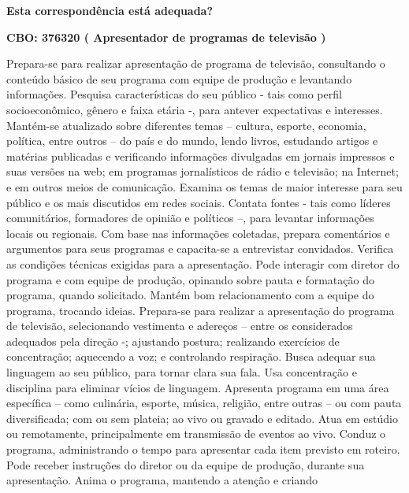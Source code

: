 \documentclass[
]{article}
\begin{document}
\begin{Form}
\textbf{Esta correspondência está adequada?} \\ 
\end{Form}

\textbf{CBO: 376320  ( Apresentador de programas de televisão )}

Prepara-se para realizar apresentação de programa de televisão,
consultando o conteúdo básico de seu programa com equipe de produção e
levantando informações. Pesquisa características do seu público - tais
como perfil socioeconômico, gênero e faixa etária -, para antever
expectativas e interesses. Mantém-se atualizado sobre diferentes temas
-- cultura, esporte, economia, política, entre outros -- do país e do
mundo, lendo livros, estudando artigos e matérias publicadas e
verificando informações divulgadas em jornais impressos e suas versões
na web; em programas jornalísticos de rádio e televisão; na Internet; e
em outros meios de comunicação. Examina os temas de maior interesse para
seu público e os mais discutidos em redes sociais. Contata fontes - tais
como líderes comunitários, formadores de opinião e políticos --, para
levantar informações locais ou regionais. Com base nas informações
coletadas, prepara comentários e argumentos para seus programas e
capacita-se a entrevistar convidados. Verifica as condições técnicas
exigidas para a apresentação. Pode interagir com diretor do programa e
com equipe de produção, opinando sobre pauta e formatação do programa,
quando solicitado. Mantém bom relacionamento com a equipe do programa,
trocando ideias. Prepara-se para realizar a apresentação do programa de
televisão, selecionando vestimenta e adereços -- entre os considerados
adequados pela direção -; ajustando postura; realizando exercícios de
concentração; aquecendo a voz; e controlando respiração. Busca adequar
sua linguagem ao seu público, para tornar clara sua fala. Usa
concentração e disciplina para eliminar vícios de linguagem. Apresenta
programa em uma área específica -- como culinária, esporte, música,
religião, entre outras -- ou com pauta diversificada; com ou sem
plateia; ao vivo ou gravado e editado. Atua em estúdio ou remotamente,
principalmente em transmissão de eventos ao vivo. Conduz o programa,
administrando o tempo para apresentar cada item previsto em roteiro.
Pode receber instruções do diretor ou da equipe de produção, durante sua
apresentação. Anima o programa, mantendo a atenção e criando
\end{document}
